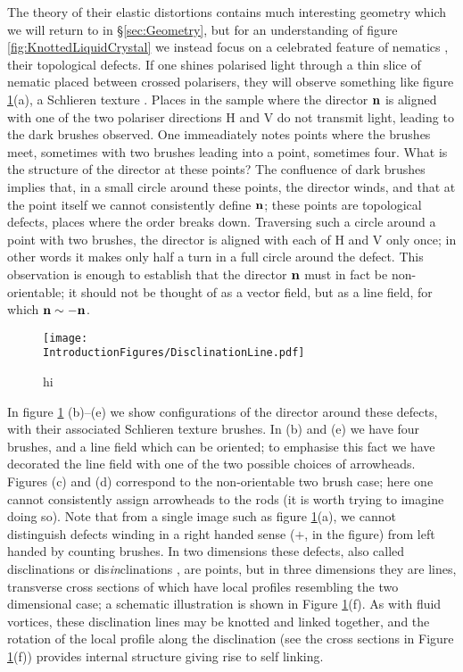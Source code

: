 The theory of their elastic distortions contains much interesting geometry which we will return to in \S \ref{sec:Geometry}, but for an understanding of figure \ref{fig:KnottedLiquidCrystal} we instead focus on a celebrated feature of nematics \cite{Frank}, their topological defects. If one shines polarised light through a thin slice of nematic placed between crossed polarisers, they will observe something like figure \ref{fig:Disclination}(a), a Schlieren texture \cite{DeGennes}. Places in the sample where the director $\bf n$ is aligned with one of the two polariser directions H and V do not transmit light, leading to the dark brushes observed. One immeadiately notes points where the brushes meet, sometimes with two brushes leading into a point, sometimes four. What is the structure of the director at these points? The confluence of dark brushes implies that, in a small circle around these points, the director winds, and that at the point itself we cannot consistently define $\bf n$; these points are topological defects, places where the order breaks down. Traversing such a circle around a point with two brushes, the director is aligned with each of H and V only once; in other words it makes only half a turn in a full circle around the defect. This observation is enough to establish that the director $\bf{n}$ must in fact be non-orientable; it should not be thought of as a vector field, but as a line field, for which $\bf n \sim - \bf n$.
\begin{figure}[htbp]
\centering
\texttt{[image: \\IntroductionFigures/DisclinationLine.pdf]}
\caption{hi }
\label{fig:Disclination}
\end{figure}
In figure \ref{fig:Disclination} (b)--(e) we show configurations of the director around these defects, with their associated Schlieren texture brushes. In (b) and (e) we have four brushes, and a line field which can be oriented; to emphasise this fact we have decorated the line field with one of the two possible choices of arrowheads. Figures (c) and (d) correspond to the non-orientable two brush case; here one cannot consistently assign arrowheads to the rods (it is worth trying to imagine doing so). Note that from a single image such as figure \ref{fig:Disclination}(a), we cannot distinguish defects winding in a right handed sense ($+$, in the figure) from left handed by counting brushes.  In two dimensions these defects, also called disclinations or dis\emph{in}clinations \cite{Frank}, are points, but in three dimensions they are lines, transverse cross sections of which have local profiles resembling the two dimensional case; a schematic illustration is shown in Figure \ref{fig:Disclination}(f). As with fluid vortices, these disclination lines may be knotted and linked together, and the rotation of the local profile along the disclination (see the cross sections in Figure \ref{fig:Disclination}(f)) provides internal structure giving rise to self linking.

